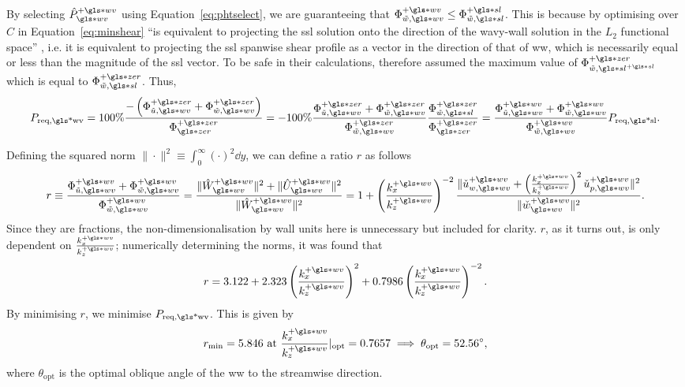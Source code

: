 By selecting  $\hat{P}\ww\pw$ using Equation~\eqref{eq:phtselect}, we are guaranteeing that $\Phi _{\tilde{w},\gls*{wv}}\pw\leq\Phi _{\tilde{w},\gls*{sl}}\ps$. This is because by optimising over $C$ in Equation~\eqref{eq:minshear} ``is equivalent to projecting the \gls*{ssl} solution onto the direction of the wavy-wall solution in the $L_2$ functional space'' \cite{chernyshenko2013}, i.e. it is equivalent to projecting the \gls*{ssl} spanwise shear profile as a vector in the direction of that of \gls*{ww}, which is necessarily equal or less than the magnitude of the \gls*{ssl} vector. To be safe in their calculations, \textcite{chernyshenko2013} therefore assumed the maximum value of $\Phi _{\tilde{w},\gls*{sl}\ps}\pz$ which is equal to $\Phi _{\tilde{w},\gls*{sl}}\pz$. Thus,
\begin{equation}
	P_\text{req,\gls*{wv}} = 100\% \frac{-\left(\Phi _{\tilde{u},\gls*{wv}}\pz+\Phi _{\tilde{w},\gls*{wv}}\pz\right)}{\Phi \zz\pz}
	= -100\% \frac{\Phi _{\tilde{u},\gls*{wv}}\pz+\Phi _{\tilde{w},\gls*{wv}}\pz}{\Phi _{\tilde{w},\gls*{wv}}\pz}\frac{\Phi _{\tilde{w},\gls*{sl}}\pz}{\Phi \zz\pz}
	= \frac{\Phi _{\tilde{u},\gls*{wv}}\pw+\Phi _{\tilde{w},\gls*{wv}}\pw}{\Phi _{\tilde{w},\gls*{wv}}\pw}P_\text{req,\gls*{sl}}
.\end{equation}

Defining the squared norm $\|\cdot\|^2\equiv \int_{0}^{\infty} \left( \cdot \right) ^{2} \dd{y}  $, we can define a ratio $r$ as follows
\begin{equation}
	r\equiv\frac{\Phi _{\tilde{u},\gls*{wv}}\pw+\Phi _{\tilde{w},\gls*{wv}}\pw}{\Phi _{\tilde{w},\gls*{wv}}\pw}=\frac{\|\hat{W}\pw\ww\|^2+\|\hat{U}\pw\ww\|^2}{\|\hat{W}\pw\ww\|^2}=1+\left( \frac{k_x\pw}{k_z\pw} \right) ^{-2} \frac{\|\check{u}_{w,\gls*{wv}}\pw+\left( \frac{k_x\pw}{k_z\pw} \right) ^2 \check{u}_{p,\gls*{wv}}\pw\|^2}{\|\check{w}\ww\pw\|^2}
.\end{equation}
Since they are fractions, the non-dimensionalisation by wall units here is unnecessary but included for clarity. $r$, as it turns out, is only dependent on $\frac{k_x\pw}{k_z\pw}$; numerically determining the norms, it was found that
\begin{equation}
	r=3.122+2.323 \left( \frac{k_x\pw}{k_z\pw} \right) ^2+0.7986 \left( \frac{k_x\pw}{k_z\pw} \right) ^{-2} 
.\end{equation}
By minimising $r$, we minimise $P_\text{req,\gls*{wv}} $. This is given by
\begin{equation}
	r_\text{min} =5.846 \text{ at } \frac{k_x\pw}{k_z\pw}\rvert_\text{opt} = 0.7657 \implies \theta_\text{opt} = \ang{52.56}
,\end{equation}
where $\theta_\text{opt} $ is the optimal oblique angle of the \gls*{ww} to the streamwise direction.

